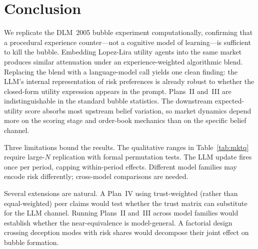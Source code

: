 \section{Conclusion}
\label{sec:conclusion}

We replicate the DLM~2005 bubble experiment computationally,
confirming that a procedural experience counter---not a cognitive
model of learning---is sufficient to kill the bubble.  Embedding
Lopez-Lira utility agents into the same market produces similar
attenuation under an experience-weighted algorithmic blend.
Replacing the blend with a language-model call yields one clean
finding: the LLM's internal representation of risk preferences is
already robust to whether the closed-form utility expression appears
in the prompt.  Plans~II and~III are indistinguishable in the
standard bubble statistics.  The downstream expected-utility score
absorbs most upstream belief variation, so market dynamics depend more
on the scoring stage and order-book mechanics than on the specific
belief channel.

Three limitations bound the results.  The qualitative ranges in
Table~\ref{tab:mktq} require large-$N$ replication with formal
permutation tests.  The LLM update fires once per period, capping
within-period effects.  Different model families may encode risk
differently; cross-model comparisons are needed.

Several extensions are natural.  A Plan~IV using trust-weighted (rather
than equal-weighted) peer claims would test whether the trust matrix
can substitute for the LLM channel.  Running Plans~II and~III across
model families would establish whether the near-equivalence is
model-general.  A factorial design crossing deception modes with risk
shares would decompose their joint effect on bubble formation.
